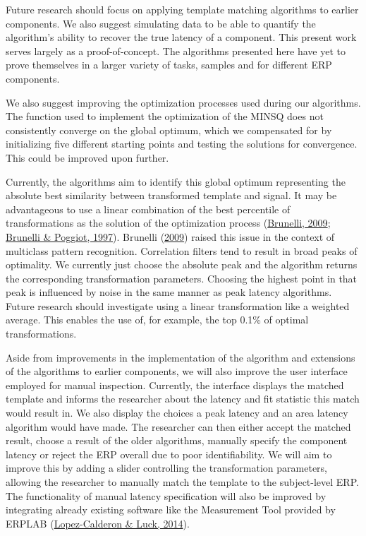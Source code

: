 \documentclass[
  man]{apa7}
\begin{document}
Future research should focus on applying template matching algorithms to earlier components. We also suggest simulating data to be able to quantify the algorithm's ability to recover the true latency of a component. This present work serves largely as a proof-of-concept. The algorithms presented here have yet to prove themselves in a larger variety of tasks, samples and for different ERP components.

We also suggest improving the optimization processes used during our algorithms. The function used to implement the optimization of the MINSQ does not consistently converge on the global optimum, which we compensated for by initializing five different starting points and testing the solutions for convergence. This could be improved upon further.

Currently, the algorithms aim to identify this global optimum representing the absolute best similarity between transformed template and signal. It may be advantageous to use a linear combination of the best percentile of transformations as the solution of the optimization process (\protect\hyperlink{ref-brunelli2009template}{Brunelli, 2009}; \protect\hyperlink{ref-brunelli1997template}{Brunelli \& Poggiot, 1997}). Brunelli (\protect\hyperlink{ref-brunelli2009template}{2009}) raised this issue in the context of multiclass pattern recognition. Correlation filters tend to result in broad peaks of optimality. We currently just choose the absolute peak and the algorithm returns the corresponding transformation parameters. Choosing the highest point in that peak is influenced by noise in the same manner as peak latency algorithms. Future research should investigate using a linear transformation like a weighted average. This enables the use of, for example, the top 0.1\% of optimal transformations.

Aside from improvements in the implementation of the algorithm and extensions of the algorithms to earlier components, we will also improve the user interface employed for manual inspection. Currently, the interface displays the matched template and informs the researcher about the latency and fit statistic this match would result in. We also display the choices a peak latency and an area latency algorithm would have made. The researcher can then either accept the matched result, choose a result of the older algorithms, manually specify the component latency or reject the ERP overall due to poor identifiability. We will aim to improve this by adding a slider controlling the transformation parameters, allowing the researcher to manually match the template to the subject-level ERP. The functionality of manual latency specification will also be improved by integrating already existing software like the Measurement Tool provided by ERPLAB (\protect\hyperlink{ref-lopez2014erplab}{Lopez-Calderon \& Luck, 2014}).
\end{document}
